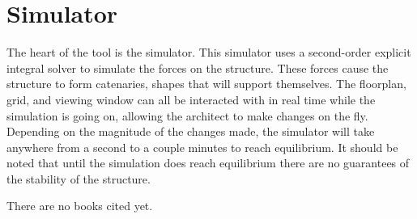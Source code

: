 \documentclass{thesis}
\begin{document}
\section{Simulator}
The heart of the tool is the simulator.  This simulator uses a second-order explicit integral solver to simulate the forces on the structure.  These forces
cause the structure to form catenaries, shapes that will support themselves.  The floorplan, grid, and viewing window can all be interacted with in real
time while the simulation is going on, allowing the architect to make changes on the fly.  Depending on the magnitude of the changes made, the simulator
will take anywhere from a second to a couple minutes to reach equilibrium.  It should be noted that until the simulation does reach equilibrium there are
no guarantees of the stability of the structure.


\begin{singlespace}
\begin{thebibliography}{99}
 There are no books cited yet.
\end{thebibliography}
\end{singlespace}

%
%
\end{document}
